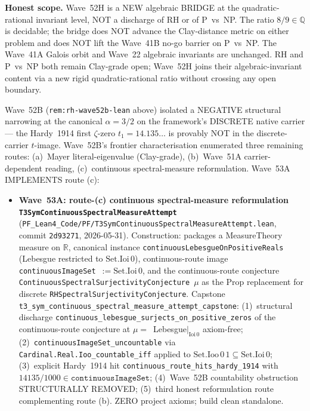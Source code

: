 \begin{remark}
\textbf{Honest scope.} Wave~52H is a NEW algebraic BRIDGE at the quadratic-rational invariant level, NOT a discharge of RH or of P~vs~NP. The ratio $8/9 \in \mathbb{Q}$ is decidable; the bridge does NOT advance the Clay-distance metric on either problem and does NOT lift the Wave~41B no-go barrier on P~vs~NP. The Wave~41A Galois orbit and Wave~22 algebraic invariants are unchanged. RH and P~vs~NP both remain Clay-grade open; Wave~52H joins their algebraic-invariant content via a new rigid quadratic-rational ratio without crossing any open boundary.
\end{remark}

\begin{remark}\label{rem:rh-wave53a-lean}
Wave~52B (\texttt{rem:rh-wave52b-lean} above) isolated a NEGATIVE structural narrowing at the canonical $\alpha = 3/2$ on the framework's DISCRETE native carrier --- the Hardy~1914 first $\zeta$-zero $t_1 = 14.135\ldots$ is provably NOT in the discrete-carrier $t$-image. Wave~52B's frontier characterisation enumerated three remaining routes: (a)~Mayer literal-eigenvalue (Clay-grade), (b)~Wave~51A carrier-dependent reading, (c)~continuous spectral-measure reformulation. Wave~53A IMPLEMENTS route (c):
\begin{itemize}
  \item \textbf{Wave~53A: route-(c) continuous spectral-measure reformulation \texttt{T3SymContinuousSpectralMeasureAttempt}} (\texttt{PF\_Lean4\_Code/PF/T3SymContinuousSpectralMeasureAttempt.lean}, commit \texttt{2d93271}, 2026-05-31). Construction: packages a MeasureTheory measure on $\mathbb{R}$, canonical instance \texttt{continuousLebesgueOnPositiveReals} (Lebesgue restricted to $\mathrm{Set.Ioi}\,0$), continuous-route image \texttt{continuousImageSet}~$:=\mathrm{Set.Ioi}\,0$, and the continuous-route conjecture \texttt{ContinuousSpectralSurjectivityConjecture}~$\mu$ as the Prop replacement for discrete \texttt{RHSpectralSurjectivityConjecture}. Capstone \texttt{t3\_sym\_continuous\_spectral\_measure\_attempt\_capstone}: (1)~structural discharge \texttt{continuous\_lebesgue\_surjects\_on\_positive\_zeros} of the continuous-route conjecture at $\mu = $~Lebesgue$|_{\mathrm{Ioi}\,0}$ axiom-free; (2)~\texttt{continuousImageSet\_uncountable} via \texttt{Cardinal.Real.Ioo\_countable\_iff} applied to $\mathrm{Set.Ioo}\,0\,1 \subseteq \mathrm{Set.Ioi}\,0$; (3)~explicit Hardy~1914 hit \texttt{continuous\_route\_hits\_hardy\_1914} with $14135/1000 \in \texttt{continuousImageSet}$; (4)~Wave~52B countability obstruction STRUCTURALLY REMOVED; (5)~third honest reformulation route complementing route (b). ZERO project axioms; build clean standalone.

\end{itemize}
\end{remark}
